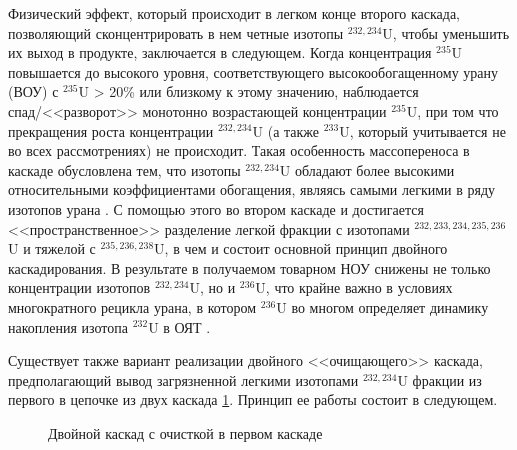 Физический эффект, который происходит в легком конце второго каскада, позволяющий сконцентрировать в нем четные изотопы $^{232,234}$U, чтобы уменьшить их выход в продукте, заключается в следующем. Когда концентрация $^{235}$U повышается до высокого уровня, соответствующего высокообогащенному урану (ВОУ) с $^{235}$U > 20\% или близкому к этому значению, наблюдается спад/<<разворот>> монотонно возрастающей концентрации $^{235}$U, при том что прекращения роста концентрации $^{232,234}$U (а также $^{233}$U, который учитывается не во всех рассмотрениях) не происходит. Такая особенность массопереноса в каскаде обусловлена тем, что изотопы $^{232,234}$U обладают более высокими относительными коэффициентами обогащения, являясь самыми легкими в ряду изотопов урана \cite{borodynyaIssledovanieProblemyVovlecheniya1989}.  С помощью этого во втором каскаде и достигается <<пространственное>> разделение легкой фракции с изотопами $^{232,233,234,235,236}$U и тяжелой с $^{235,236,238}$U, в чем и состоит основной принцип двойного каскадирования. В результате в получаемом товарном НОУ снижены не только концентрации изотопов $^{232,234}$U, но и $^{236}$U, что крайне важно в условиях многократного рецикла урана, в котором $^{236}$U во многом определяет динамику накопления изотопа $^{232}$U в ОЯТ \cite{dudnikovInfluence236UEfficacy2016}. 

Существует также вариант реализации двойного <<очищающего>> каскада, предполагающий вывод загрязненной легкими изотопами $^{232,234}$U фракции из первого в цепочке из двух каскада \ref{fig:pure_double}. Принцип ее работы состоит в следующем.

\begin{figure}[ht]
  \caption{Двойной каскад с очисткой в первом каскаде}\label{fig:pure_double}
\end{figure}

